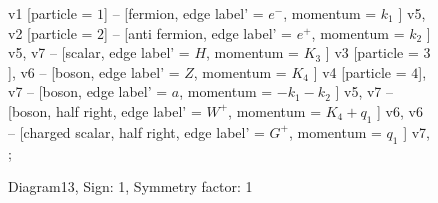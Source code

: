 \documentclass{revtex4}
\begin{document}
\begin{figure}[!htb]
\begin{center}
{    %
v1 [particle = \(1\)] -- [fermion, edge label' = \(e^{-}\), momentum = \(k_{1}\) ] v5, 
v2 [particle = \(2\)] -- [anti fermion, edge label' = \(e^{+}\), momentum = \(k_{2}\) ] v5, 
v7 -- [scalar, edge label' = \(H\), momentum = \(K_{3}\) ] v3 [particle = \(3\)], 
v6 -- [boson, edge label' = \(Z\), momentum = \(K_{4}\) ] v4 [particle = \(4\)], 
v7 -- [boson, edge label' = \(a\), momentum = \(-k_{1} - k_{2}\) ] v5, 
v7 -- [boson, half right, edge label' = \(W^{+}\), momentum = \(K_{4} + q_{1}\) ] v6, 
v6 -- [charged scalar, half right, edge label' = \(G^{+}\), momentum = \(q_{1}\) ] v7, 
};
\end{center}
\caption{Diagram13, Sign: 1, Symmetry factor: 1}
\end{figure}
\newpage
\end{document}
